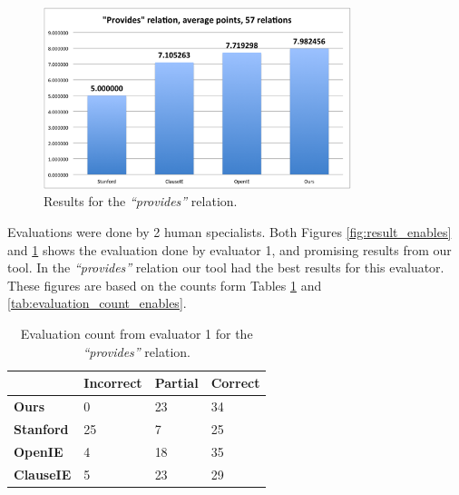 \documentclass[11pt,a4paper,openright]{memoir}
\begin{document}
\begin{figure}[!htbp]
  \centering
    \includegraphics[width=0.8\textwidth]{./images/image002}
  \caption[Results for the \emph{\enquote{provides}} relation.]{Results for the \emph{\enquote{provides}} relation.}
  \label{fig:result_provides}
\end{figure}

Evaluations were done by 2 human specialists. Both Figures \ref{fig:result_enables} and \ref{fig:result_provides} shows the evaluation done by evaluator 1, and promising results from our tool. In the \emph{\enquote{provides}} relation our tool had the best results for this evaluator. These figures are based on the counts form Tables \ref{tab:evaluation_count_provides} and \ref{tab:evaluation_count_enables}.


\begin{table}[!htbp]
  \centering
    \begin{tabular}{|m{2cm}|m{2cm}|m{2cm}|m{2cm}|}
\hline

 & \textbf{Incorrect} & \textbf{Partial} & \textbf{Correct} \\
\hline

\textbf{Ours}  & 0 & 23 & 34 \\
\hline

\textbf{Stanford}  & 25 & 7 & 25 \\
\hline

\textbf{OpenIE}  & 4 & 18 & 35 \\
\hline

\textbf{ClauseIE}  & 5 & 23 & 29 \\
\hline
    \end{tabular}
  \caption[Evaluation count from evaluator 1 for the \emph{\enquote{provides}} relation.]{Evaluation count from evaluator 1 for the \emph{\enquote{provides}} relation.}
  \label{tab:evaluation_count_provides}
\end{table}
\end{document}
